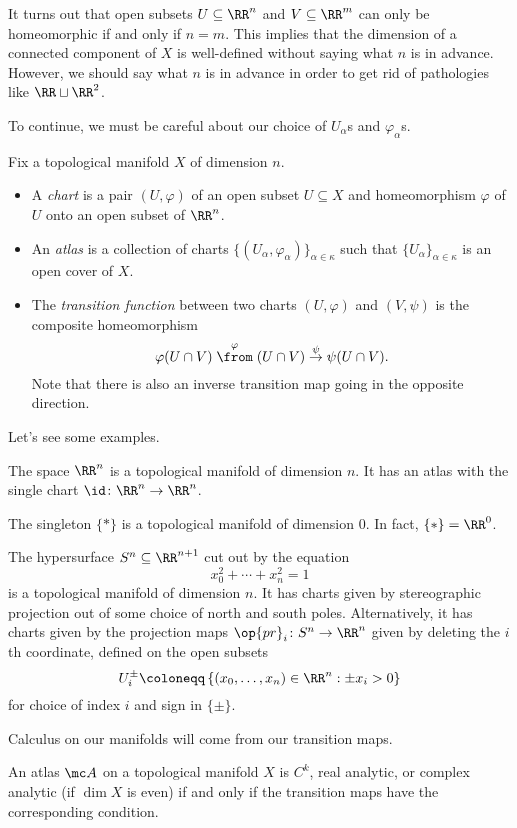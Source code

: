 \documentclass[../notes.tex]{subfiles}
\begin{document}
\begin{remark}
	It turns out that open subsets $U\subseteq\RR^n$ and $V\subseteq\RR^m$ can only be homeomorphic if and only if $n=m$. This implies that the dimension of a connected component of $X$ is well-defined without saying what $n$ is in advance. However, we should say what $n$ is in advance in order to get rid of pathologies like $\RR\sqcup\RR^2$.
\end{remark}
To continue, we must be careful about our choice of $U_\alpha$s and $\varphi_\alpha$s.
\begin{defihelper}   
	Fix a topological manifold $X$ of dimension $n$.
	\begin{itemize}
		\item A \textit{chart} is a pair $(U,\varphi)$ of an open subset $U\subseteq X$ and homeomorphism $\varphi$ of $U$ onto an open subset of $\RR^n$.
		\item An \textit{atlas} is a collection of charts $\{(U_\alpha,\varphi_\alpha)\}_{\alpha\in\kappa}$ such that $\{U_\alpha\}_{\alpha\in\kappa}$ is an open cover of $X$.
		\item The \textit{transition function} between two charts $(U,\varphi)$ and $(V,\psi)$ is the composite homeomorphism
		\[\varphi(U\cap V)\stackrel\varphi\from (U\cap V)\stackrel\psi\to\psi(U\cap V).\]
		Note that there is also an inverse transition map going in the opposite direction.
	\end{itemize}
\end{defihelper}
Let's see some examples.
\begin{example}
	The space $\RR^n$ is a topological manifold of dimension $n$. It has an atlas with the single chart $\id\colon\RR^n\to\RR^n$.
\end{example}
\begin{example}
	The singleton $\{*\}$ is a topological manifold of dimension $0$. In fact, $\{*\}=\RR^0$.
\end{example}
\begin{example} \label{ex:sphere}
	The hypersurface $S^n\subseteq\RR^{n+1}$ cut out by the equation
	\[x_0^2+\cdots+x_n^2=1\]
	is a topological manifold of dimension $n$. It has charts given by stereographic projection out of some choice of north and south poles. Alternatively, it has charts given by the projection maps $\op{pr}_i\colon S^n\to\RR^n$ given by deleting the $i$th coordinate, defined on the open subsets
	\[U_i^\pm\coloneqq\left\{(x_0,\ldots,x_n)\in\RR^n:\pm x_i>0\right\}\]
	for choice of index $i$ and sign in $\{\pm\}$.
\end{example}
Calculus on our manifolds will come from our transition maps.
\begin{definition}
	An atlas $\mc A$ on a topological manifold $X$ is $C^k$, real analytic, or complex analytic (if $\dim X$ is even) if and only if the transition maps have the corresponding condition.
\end{definition}
\end{document}
